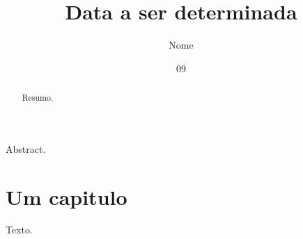 \documentclass[dsc]{ufrj}
\title{Data a ser determinada}
\author{Nome}{Sobrenome}
\date{09}{2026}
\begin{document}
  \maketitle
  \frontmatter
  \begin{abstract}Resumo.\end{abstract}
  \begin{foreignabstract}Abstract.\end{foreignabstract}
  \tableofcontents
  \mainmatter
  \chapter{Um capitulo}
  Texto.
\end{document}
